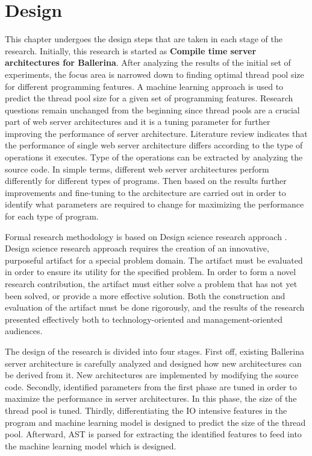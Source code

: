 \chapter{Design}\label{chap:3}


This chapter undergoes the design steps that are taken in each stage of the research. Initially, this research is started as\textbf{ Compile time server architectures for Ballerina}. After analyzing the results of the initial set of experiments, the focus area is narrowed down to finding optimal thread pool size for different programming features. A machine learning approach is used to predict the thread pool size for a given set of programming features. Research questions remain unchanged from the beginning since thread pools are a crucial part of web server architectures and it is a tuning parameter for further improving the performance of server architecture. Literature review indicates that the performance of single web server architecture differs according to the type of operations it executes. Type of the operations can be extracted by analyzing the source code.  In simple terms, different web server architectures perform differently for different types of programs. Then based on the results further improvements and fine-tuning to the architecture are carried out in order to identify what parameters are required to change for maximizing the performance for each type of program. 

Formal research methodology is based on Design science research approach \cite{design_science}. Design science research approach requires the creation of an innovative, purposeful artifact for a special problem domain. The artifact must be evaluated in order to ensure its utility for the specified problem. In order to form a novel research contribution, the artifact must either solve a problem that has not yet been solved, or provide a more effective solution. Both the construction and evaluation of the artifact must be done rigorously, and the results of the research presented effectively both to technology-oriented and management-oriented audiences.

The design of the research is divided into four stages. First off, existing Ballerina server architecture is carefully analyzed and designed how new architectures can be derived from it. New architectures are implemented by modifying the source code. Secondly, identified parameters from the first phase are tuned in order to maximize the performance in server architectures. In this phase, the size of the thread pool is tuned. Thirdly, differentiating the IO intensive features in the program and machine learning model is designed to predict the size of the thread pool. Afterward, \acrshort{AST} is parsed for extracting the identified features to feed into the machine learning model which is designed. 

